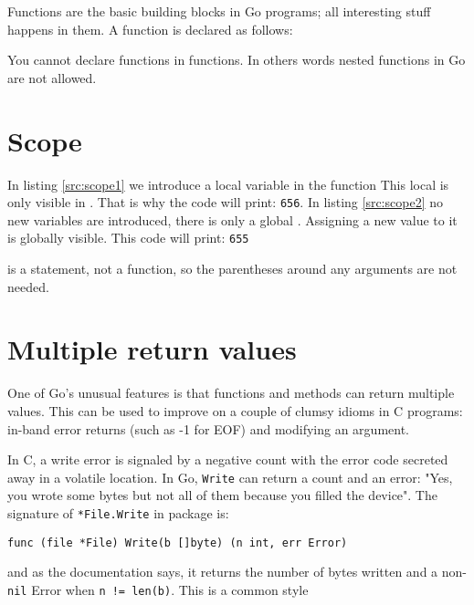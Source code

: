 
\noindent{}Functions are the basic building blocks in Go programs; all interesting
stuff happens in them. A function is declared as follows:

\showremarks

You cannot declare functions in functions. In others words nested
functions in Go are not allowed.

\section{Scope}

\begin{minipage}{.5\textwidth}

\hfill
\vfill
\end{minipage}
\begin{minipage}{.5\textwidth}

\hfill
\vfill
\end{minipage}

In listing \ref{src:scope1} we introduce a local variable 
in the function 
This local  is only visible in . That is
why the code will print: \texttt{656}.
In listing \ref{src:scope2} no new variables are introduced, there
is only a global .
Assigning a new value to it is globally visible. This code will
print: \texttt{655}

 is a statement, not a function, so the parentheses around
any arguments are not needed.

\section{Multiple return values}
\label{sec:multiple return}

One of Go's unusual features is that functions and methods can return multiple
values. This can be used to improve on a couple of clumsy idioms in C programs:
in-band error returns (such as -1 for EOF) and modifying an argument.

In C, a write error is signaled by a negative count with the error code
secreted away in a volatile location. In Go, \lstinline{Write} can return a count and an
error: "Yes, you wrote some bytes but not all of them because you filled the
device". The signature of \lstinline{*File.Write} in package
 is:
\begin{lstlisting}
func (file *File) Write(b []byte) (n int, err Error)
\end{lstlisting}
and as the documentation says, it returns the number of bytes written and a
non-\lstinline{nil} Error when \lstinline{n != len(b)}. This is a common style

